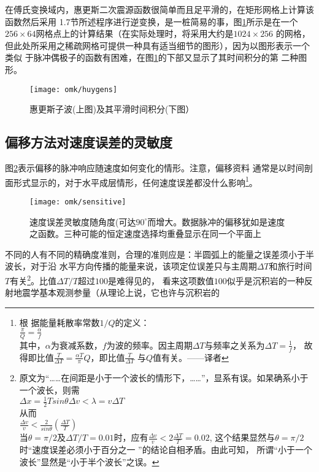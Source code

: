 在傅氏变换域内，惠更斯二次震源函数很简单而且足平滑的，在矩形网格上计算该函数然后采用
1.7节所述程序进行逆变换，是一桩简易的事，图\ref{fig:omk/huygens}所示是在一个
$256\times 64$网格点上的计算结果（在实际处理时，将采用大约是$1024\times 256$
的网格，但此处所采用之稀疏网格可提供一种具有适当细节的图形），因为以图形表示一个类似
于脉冲偶极子的函数有困难，在图\ref{fig:omk/huygens}的下部又显示了其时间积分的第
二种图形。
\begin{figure}[H]
\centering
\texttt{[image: omk/huygens]}
\caption[huygens]{惠更斯子波(上图)及其平滑时间积分(下图）}
\label{fig:omk/huygens}
\end{figure}
\subsection{偏移方法对速度误差的灵敏度}
图\ref{fig:omk/sensitive}表示偏移的脉冲响应随速度如何变化的情形。注意，偏移资料
通常是以时间剖面形式显示的，对于水平成层情形，任何速度误差都没什么影响\footnote{根
据能量耗散率常数$1/Q$的定义：\\ 
$\frac{\pi}{Q}=\frac{\alpha}{f}$\\
其中，$\alpha$为衰减系数，$f$为波的频率。因主周期$\Delta T$与频率之关系为$\Delta T = \frac{1}{f}$，
故得即比值$\frac{T}{\Delta T}=\frac{\alpha T}{\pi}Q$，即比值$\frac{T}{\Delta T}$
与$Q$值有关。——译者}。
\begin{figure}[H]
\centering
\texttt{[image: omk/sensitive]}
\caption[sensitive]{速度误差灵敏度随角度(可达$90^{\circ}$而增大。数据脉冲的偏移犹如是速度
之函数。三种可能的恒定速度选择均重叠显示在同一个平面上}
\label{fig:omk/sensitive}
\end{figure}
不同的人有不同的精确度准则，合理的准则应是：半圆弧上的能量之误差须小于半波长，对于沿
水平方向传播的能量来说，该项定位误差只与主周期$\Delta T$和旅行时间$T$有关\footnote{原文为“\ldots\ldots{}在间距是小于一个波长的情形下，\ldots\ldots”，显系有误。如杲确系小于一个波长，则需\\
$\Delta x=\frac{1}{2}Tsin\theta\Delta v<\lambda=v\Delta T$\\
从而\\
$\frac{\Delta v}{v}<\frac{2}{sin\theta}(\frac{\Delta T}{T})$\\
当$\theta=\pi/2$及$\Delta T/T=0.01$时，应有$\frac{\Delta v}{v}<2\frac{\Delta T}{T}=0.02$,
这个结果显然与$\theta=\pi/2$时“速度误差必须小于百分之一 ”的结论自相矛盾。由此可知，
所谓“小于一个波长”显然是“小于半个波长”之误。}。比值$\Delta T/T$超过$100$是难得见的，
看来这项数值$100$似乎是沉积岩的一种反射地震学基本观测参量（从理论上说，它也许与沉积岩的
